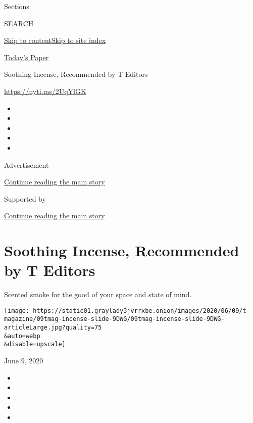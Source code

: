 Sections

SEARCH

\protect\hyperlink{site-content}{Skip to
content}\protect\hyperlink{site-index}{Skip to site index}

\href{https://myaccount.nytimes3xbfgragh.onion/auth/login?response_type=cookie\&client_id=vi}{}

\href{https://www.nytimes3xbfgragh.onion/section/todayspaper}{Today's
Paper}

Soothing Incense, Recommended by T Editors

\url{https://nyti.ms/2UqYlGK}

\begin{itemize}
\item
\item
\item
\item
\item
\end{itemize}

Advertisement

\protect\hyperlink{after-top}{Continue reading the main story}

Supported by

\protect\hyperlink{after-sponsor}{Continue reading the main story}

\hypertarget{soothing-incense-recommended-by-t-editors}{%
\section{Soothing Incense, Recommended by T
Editors}\label{soothing-incense-recommended-by-t-editors}}

Scented smoke for the good of your space and state of mind.

\texttt{[image: https://static01.graylady3jvrrxbe.onion/images/2020/06/09/t-magazine/09tmag-incense-slide-9DWG/09tmag-incense-slide-9DWG-articleLarge.jpg?quality=75\\\&auto=webp\\\&disable=upscale]}

June 9, 2020

\begin{itemize}
\item
\item
\item
\item
\item
\end{itemize}

